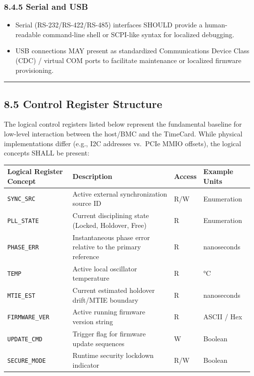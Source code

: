 \documentclass[
]{article}
\newcounter{none} %
\begin{document}
\subsubsection{8.4.5 Serial and USB}\label{serial-and-usb}

\begin{itemize}
\item
  Serial (RS-232/RS-422/RS-485) interfaces SHOULD provide a
  human-readable command-line shell or SCPI-like syntax for localized
  debugging.
\item
  USB connections MAY present as standardized Communications Device
  Class (CDC) / virtual COM ports to facilitate maintenance or localized
  firmware provisioning.
\end{itemize}

\begin{center}\rule{0.5\linewidth}{0.5pt}\end{center}

\subsection{8.5 Control Register
Structure}\label{control-register-structure}

The logical control registers listed below represent the fundamental
baseline for low-level interaction between the host/BMC and the
TimeCard. While physical implementations differ (e.g., I2C addresses
vs.~PCIe MMIO offsets), the logical concepts SHALL be present:

{\def\LTcaptype{none} %
\begin{longtable}[]{@{}
  >{\raggedright\arraybackslash}p{}
  >{\raggedright\arraybackslash}p{}
  >{\raggedright\arraybackslash}p{}
  >{\raggedright\arraybackslash}p{}@{}}
\toprule\noalign{}
Logical Register Concept & Description & Access & Example Units \\
\midrule\noalign{}
\endhead
\bottomrule\noalign{}
\endlastfoot
\texttt{SYNC\_SRC} & Active external synchronization source ID & R/W &
Enumeration \\
\texttt{PLL\_STATE} & Current disciplining state (Locked, Holdover,
Free) & R & Enumeration \\
\texttt{PHASE\_ERR} & Instantaneous phase error relative to the primary
reference & R & nanoseconds \\
\texttt{TEMP} & Active local oscillator temperature & R & °C \\
\texttt{MTIE\_EST} & Current estimated holdover drift/MTIE boundary & R
& nanoseconds \\
\texttt{FIRMWARE\_VER} & Active running firmware version string & R &
ASCII / Hex \\
\texttt{UPDATE\_CMD} & Trigger flag for firmware update sequences & W &
Boolean \\
\texttt{SECURE\_MODE} & Runtime security lockdown indicator & R/W &
Boolean \\
\end{longtable}
}
\end{document}
